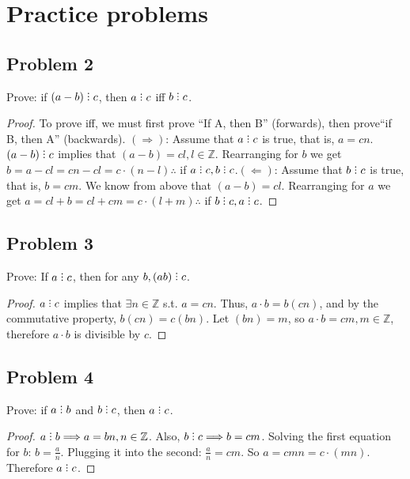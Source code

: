 \documentclass[12pt]{article}
\title{\scalebox{2}{Math 341 Homework 2}}
\author{\scalebox{1.5}{Theo Koss}}
\date{September 2020}
\newcommand{\Z}{\mathbb{Z}}
\newcommand{\divby}{%
  \mathrel{\text{\vbox{\baselineskip.65ex\lineskiplimit0pt\hbox{.}\hbox{.}\hbox{.}}}}%
  }
\begin{document}
\maketitle
\section{Practice problems}
\subsection{Problem 2}
Prove: if $(a-b)\divby c$, then $a\divby c$ iff $b\divby c$.
\begin{proof}
To prove iff, we must first prove ``If A, then B'' (forwards), then prove``if B, then A'' (backwards). \newline $(\Longrightarrow)$: Assume that $a\divby c$ is true, that is, $a=cn$. $(a-b)\divby c$ implies that $(a-b)=cl, l\in \Z$. Rearranging for $b$ we get $b=a-cl=cn-cl=c\cdot(n-l)\therefore$ if $a\divby c, b\divby c$.\newline $(\Longleftarrow)$: Assume that $b\divby c$ is true, that is, $b=cm$. We know from above that $(a-b)=cl$. Rearranging for $a$ we get $a=cl+b=cl+cm=c\cdot(l+m) \therefore$ if $b\divby c, a\divby c$.
\end{proof}
\subsection{Problem 3}
Prove: If $a\divby c$, then for any $b,(ab)\divby c$.
\begin{proof}
$a\divby c$ implies that $\exists n \in \Z$ s.t. $a=cn$. Thus, $a\cdot b=b(cn)$, and by the commutative property, $b(cn)=c(bn)$. Let $(bn)=m$, so $a\cdot b=cm, m\in \Z$, therefore $a\cdot b$ is divisible by $c$.
\end{proof}
\newpage\subsection{Problem 4}
Prove: if $a\divby b$ and $b\divby c$, then $a\divby c$.
\begin{proof}
$a\divby b \Longrightarrow a=bn, n\in \Z$. Also, $b\divby c \Longrightarrow b=cm$. Solving the first equation for $b$: $b=\frac{a}{n}$. Plugging it into the second: $\frac{a}{n}=cm$. So $a=cmn=c\cdot (mn)$. Therefore $a\divby c$.
\end{proof}
\end{document}
